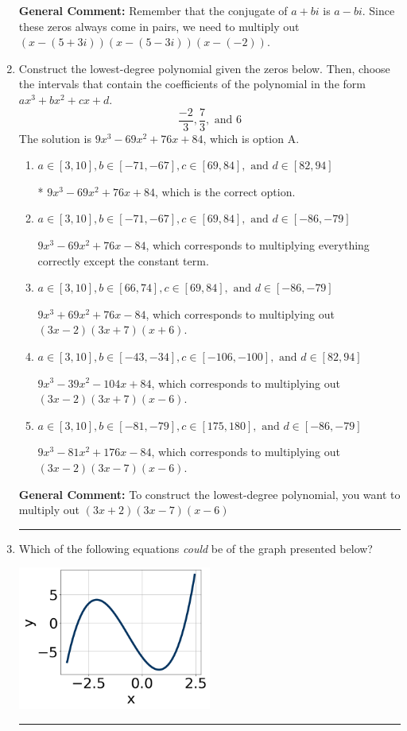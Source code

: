 \documentclass{extbook}[14pt]
\newcommand{\litem}[1]{\item #1

\rule{\textwidth}{0.4pt}}
\begin{document}
\begin{enumerate}
{\textbf{General Comment:} Remember that the conjugate of $a+bi$ is $a-bi$. Since these zeros always come in pairs, we need to multiply out $(x-(5 + 3 i))(x-(5 - 3 i))(x-(-2))$.
}
\litem{
Construct the lowest-degree polynomial given the zeros below. Then, choose the intervals that contain the coefficients of the polynomial in the form $ax^3+bx^2+cx+d$.
\[ \frac{-2}{3}, \frac{7}{3}, \text{ and } 6 \]The solution is \( 9x^{3} -69 x^{2} +76 x + 84 \), which is option A.\begin{enumerate}[label=\Alph*.]
\item \( a \in [3, 10], b \in [-71, -67], c \in [69, 84], \text{ and } d \in [82, 94] \)

* $9x^{3} -69 x^{2} +76 x + 84$, which is the correct option.
\item \( a \in [3, 10], b \in [-71, -67], c \in [69, 84], \text{ and } d \in [-86, -79] \)

$9x^{3} -69 x^{2} +76 x -84$, which corresponds to multiplying everything correctly except the constant term.
\item \( a \in [3, 10], b \in [66, 74], c \in [69, 84], \text{ and } d \in [-86, -79] \)

$9x^{3} +69 x^{2} +76 x -84$, which corresponds to multiplying out $(3x -2)(3x + 7)(x + 6)$.
\item \( a \in [3, 10], b \in [-43, -34], c \in [-106, -100], \text{ and } d \in [82, 94] \)

$9x^{3} -39 x^{2} -104 x + 84$, which corresponds to multiplying out $(3x -2)(3x + 7)(x -6)$.
\item \( a \in [3, 10], b \in [-81, -79], c \in [175, 180], \text{ and } d \in [-86, -79] \)

$9x^{3} -81 x^{2} +176 x -84$, which corresponds to multiplying out $(3x -2)(3x -7)(x -6)$.
\end{enumerate}

\textbf{General Comment:} To construct the lowest-degree polynomial, you want to multiply out $(3x + 2)(3x -7)(x -6)$
}
\litem{
Which of the following equations \textit{could} be of the graph presented below?

\begin{center}
    \includegraphics[width=0.5\textwidth]{../Figures/polyGraphToFunctionC.png}
\end{center}


}
\end{enumerate}
\end{document}
